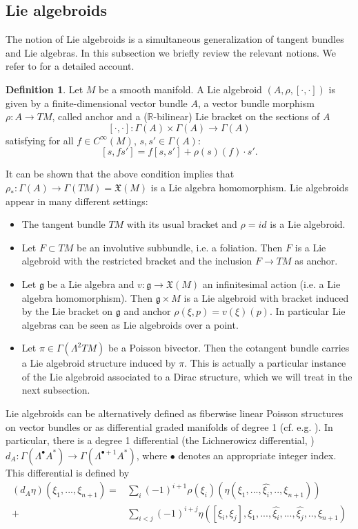 \documentclass[a4paper,12pt]{amsart}
\theoremstyle{definition}
\newtheorem{Definition}{Definition}[section]
\begin{document}
\subsection{Lie algebroids}
The notion of Lie algebroids is a simultaneous generalization of tangent bundles and Lie algebras. In this subsection we briefly review the relevant notions. We refer to \cite{Mackenzie} for a detailed account.

\begin{Definition}
Let $M$ be a smooth manifold. A Lie algebroid $(A,\rho, [\cdot,\cdot])$ is given by a finite-dimensional vector bundle $A$, a vector bundle morphism $\rho:A\to TM$, called anchor and a ($\mathbb R$-bilinear) Lie bracket on the sections of $A$ $$[\cdot,\cdot]:\Gamma(A)\times \Gamma(A)\to \Gamma(A)$$ satisfying for all $f\in C^\infty(M)$, $s,s'\in \Gamma(A)$:
$$[s,fs']=f[s,s']+\rho(s)(f)\cdot s'.$$
\end{Definition}

It can be shown that the above condition implies that $\rho_*:\Gamma(A)\to \Gamma(TM)=\mathfrak X(M)$ is a Lie algebra homomorphism. Lie algebroids appear in many different settings:
\begin{itemize}
    \item The tangent bundle $TM$ with its usual bracket and $\rho=id$ is a Lie algebroid.
    \item Let $F\subset TM$ be an involutive subbundle, i.e. a foliation. Then $F$ is a Lie algebroid with the restricted bracket and the inclusion $F\to TM$ as anchor.
    \item Let $\mathfrak g$ be a Lie algebra and $v:\mathfrak g\to \mathfrak X(M)$ an infinitesimal action (i.e. a Lie algebra homomorphism). Then $\mathfrak g\times M$ is a Lie algebroid with bracket induced by the Lie bracket on $\mathfrak g$ and anchor $\rho(\xi, p)=v(\xi)(p)$. In particular Lie algebras can be seen as Lie algebroids over a point.
    \item Let $\pi \in \Gamma(\Lambda^2TM)$ be a Poisson bivector. Then the cotangent bundle carries a Lie algebroid structure induced by $\pi$. This is actually a particular instance of the Lie algebroid associated to a Dirac structure, which we will treat in the next subsection.
\end{itemize}

Lie algebroids can be alternatively defined as fiberwise linear Poisson structures on vector bundles or as differential graded manifolds of degree 1 (cf. e.g. \cite{vaintrob}). In particular, there is a degree 1 differential (the Lichnerowicz differential, \cite{lich}) $d_A:\Gamma(\Lambda^\bullet A^*)\to \Gamma(\Lambda^{{\bullet+1}} A^*)$,  {where $\bullet$ denotes an appropriate integer index. This differential is defined by} 
\begin{align*}
   (d_A\eta)(\xi_1,...,\xi_{n+1})=&\sum_{i}(-1)^{i+1}\rho(\xi_i)(\eta(\xi_1,...,\hat{\xi_i},..,\xi_{n+1}))\\+&\sum_{i<j}(-1)^{i+j}\eta([\xi_i,\xi_j],\xi_1,...,\hat{\xi_i},...,\hat{\xi_j},..,\xi_{n+1})
\end{align*}
\end{document}
